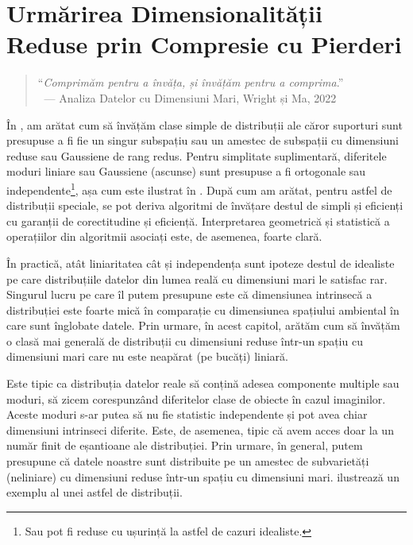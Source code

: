 \documentclass[../../book-main_ro.tex]{subfiles}
\begin{document}
\chapter{Urmărirea Dimensionalității Reduse prin Compresie cu Pierderi}
\label{ch:compression}\label{ch:general-distribution}

\begin{quote}
	\hfill    ``{\em Comprimăm pentru a învăța, și învățăm pentru a comprima}.''\\
	$~$ \hfill --- Analiza Datelor cu Dimensiuni Mari, Wright și Ma, 2022
\end{quote}
\vspace{5mm}

În , am arătat cum să învățăm clase simple de distribuții ale căror suporturi sunt presupuse a fi fie un singur subspațiu sau un amestec de subspații cu dimensiuni reduse sau Gaussiene de rang redus. Pentru simplitate suplimentară, diferitele moduri liniare sau Gaussiene (ascunse) sunt presupuse a fi ortogonale sau independente\footnote{Sau pot fi reduse cu ușurință la astfel de cazuri idealiste.}, așa cum este ilustrat în . După cum am arătat, pentru astfel de distribuții speciale, se pot deriva algoritmi de învățare destul de simpli și eficienți cu garanții de corectitudine și eficiență. Interpretarea geometrică și statistică a operațiilor din algoritmii asociați este, de asemenea, foarte clară.

În practică, atât liniaritatea cât și independența sunt ipoteze destul de idealiste pe care distribuțiile datelor din lumea reală cu dimensiuni mari le satisfac rar. Singurul lucru pe care îl putem presupune este că dimensiunea intrinsecă a distribuției este foarte mică în comparație cu dimensiunea spațiului ambiental în care sunt înglobate datele. Prin urmare, în acest capitol, arătăm cum să învățăm o clasă mai generală de distribuții cu dimensiuni reduse într-un spațiu cu dimensiuni mari care nu este neapărat (pe bucăți) liniară.

Este tipic ca distribuția datelor reale să conțină adesea componente multiple sau moduri, să zicem corespunzând diferitelor clase de obiecte în cazul imaginilor. Aceste moduri s-ar putea să nu fie statistic independente și pot avea chiar dimensiuni intrinseci diferite. Este, de asemenea, tipic că avem acces doar la un număr finit de eșantioane ale distribuției. Prin urmare, în general, putem presupune că datele noastre sunt distribuite pe un amestec de subvarietăți (neliniare) cu dimensiuni reduse într-un spațiu cu dimensiuni mari.  ilustrează un exemplu al unei astfel de distribuții.
\end{document}
